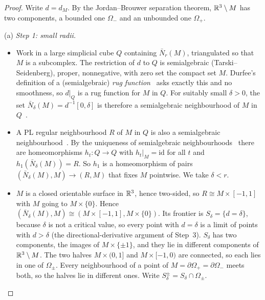 \begin{proof}
Write $d=d_M$. By the Jordan--Brouwer separation theorem, $\mathbb{R}^3\setminus M$ has two components, a bounded one
$\Omega_-$ and an unbounded one $\Omega_+$.

(a) \emph{Step 1: small radii.}
\begin{itemize}
\item Work in a large simplicial cube $Q$ containing $\bar N_r(M)$, triangulated so that $M$ is a subcomplex. The
restriction of $d$ to $Q$ is semialgebraic (Tarski--Seidenberg), proper, nonnegative, with zero set the compact set
$M$. Durfee's definition of a (semialgebraic) \emph{rug function}~\cite[Def.~3.1]{Durfee83} asks exactly this and no
smoothness, so $d|_Q$ is a rug function for $M$ in $Q$. For suitably small $\delta>0$, the set $\bar N_\delta(M)=d^{-1}[0,\delta]$
is therefore a semialgebraic neighbourhood of $M$ in $Q$~\cite[Def.~3.4]{Durfee83}.
\item A PL regular neighbourhood $R$ of $M$ in $Q$ is also a semialgebraic neighbourhood~\cite[Prop.~3.7]{Durfee83}.
By the uniqueness of semialgebraic neighbourhoods~\cite[Prop.~3.5]{Durfee83} there are homeomorphisms $h_t\colon Q\to Q$
with $h_t|_M=\mathrm{id}$ for all $t$ and $h_1(\bar N_\delta(M))=R$. So $h_1$ is a homeomorphism of pairs
$(\bar N_\delta(M),M)\to(R,M)$ that fixes $M$ pointwise. We take $\delta<r$.
\item $M$ is a closed orientable surface in $\mathbb{R}^3$, hence two-sided, so $R\cong M\times[-1,1]$ with $M$ going to
$M\times\{0\}$. Hence $(\bar N_\delta(M),M)\cong(M\times[-1,1],M\times\{0\})$. Its frontier is $S_\delta=\{d=\delta\}$,
because $\delta$ is not a critical value, so every point with $d=\delta$ is a limit of points with $d>\delta$ (the
directional-derivative argument of Step~3). $S_\delta$ has two
components, the images of $M\times\{\pm1\}$, and they lie in different components of $\mathbb{R}^3\setminus M$. The two halves
$M\times(0,1]$ and $M\times[-1,0)$ are connected, so each lies in one of $\Omega_\pm$. Every neighbourhood of a point
of $M=\partial\Omega_+=\partial\Omega_-$ meets both, so the halves lie in different ones. Write
$S_\delta^\pm=S_\delta\cap\Omega_\pm$.
\end{itemize}


\end{proof}
